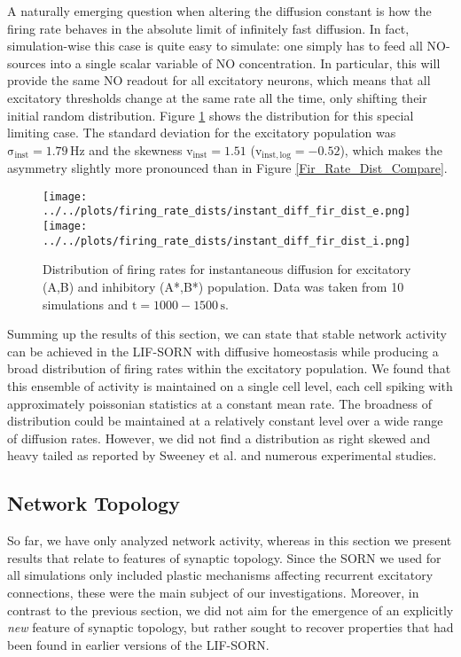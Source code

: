 \documentclass[10pt,a4paper]{article}
\begin{document}
A naturally emerging question when altering the diffusion constant is how the firing rate behaves in the absolute limit of infinitely fast diffusion. In fact, simulation-wise this case is quite easy to simulate: one simply has  to feed all NO-sources into a single scalar variable of NO concentration. In particular, this will provide the same NO readout for all excitatory neurons, which means that all excitatory thresholds change at the same rate all the time, only shifting their initial random distribution. Figure \ref{Fir_Rate_Dist_Instant_compare} shows the distribution for this special limiting case. The standard deviation for the excitatory population was $\mathrm{\sigma_{inst} = 1.79\, Hz}$ and the skewness $\mathrm{v_{inst} = 1.51}$ ($\mathrm{v_{inst,log} = -0.52}$), which makes the asymmetry slightly more pronounced than in Figure \ref{Fir_Rate_Dist_Compare}.  
\begin{figure}
\texttt{[image: ../../plots/firing\_rate\_dists/instant\_diff\_fir\_dist\_e.png]}
\texttt{[image: ../../plots/firing\_rate\_dists/instant\_diff\_fir\_dist\_i.png]}
\caption{Distribution of firing rates for instantaneous diffusion for excitatory (A,B) and inhibitory (A*,B*) population. Data was taken from 10 simulations and $\mathrm{t=1000-1500\,s}$.}
\label{Fir_Rate_Dist_Instant_compare}
\end{figure}

Summing up the results of this section, we can state that stable network activity can be achieved in the LIF-SORN with diffusive homeostasis while producing a broad distribution of firing rates within the excitatory population. We found that this ensemble of activity is maintained on a single cell level, each cell spiking with approximately poissonian statistics at a constant mean rate. The broadness of distribution could be maintained at a relatively constant level over a wide range of diffusion rates. However, we did not find a distribution as right skewed and heavy tailed as reported by Sweeney et al. and numerous experimental studies.

\subsection{Network Topology}
So far, we have only analyzed network activity, whereas in this section we present results that relate to features of synaptic topology. Since the SORN we used for all simulations only included plastic mechanisms affecting recurrent excitatory connections, these were the main subject of our investigations. Moreover, in contrast to the previous section, we did not aim for the emergence of an explicitly \emph{new} feature of synaptic topology, but rather sought to recover properties that had been found in earlier versions of the LIF-SORN.
\end{document}
